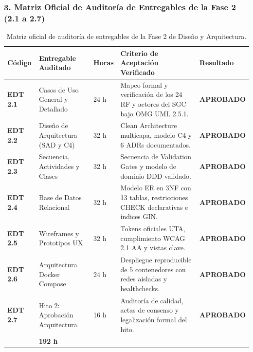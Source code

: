 \documentclass[12pt,a4paper]{article}
\begin{document}
\subsubsection*{3. Matriz Oficial de Auditoría de Entregables de la Fase 2 (2.1 a 2.7)}
\begin{table}[H]
\centering
\small
\renewcommand{\arraystretch}{1.2}
\begin{tabularx}{\textwidth}{|>{\hsize=0.55\hsize\centering\arraybackslash\bfseries\footnotesize}X|>{\hsize=1.15\hsize\raggedright\arraybackslash\footnotesize}X|>{\hsize=0.50\hsize\centering\arraybackslash\footnotesize}X|>{\hsize=2.10\hsize\raggedright\arraybackslash\footnotesize}X|>{\hsize=0.70\hsize\centering\arraybackslash\footnotesize}X|}
\hline
\rowcolor{tableheader}
\textbf{Código} & \textbf{Entregable Auditado} & \textbf{Horas} & \textbf{Criterio de Aceptación Verificado} & \textbf{Resultado} \\
\hline
\textbf{EDT 2.1} & Casos de Uso General y Detallado & 24 h & Mapeo formal y verificación de los 24 RF y actores del SGC bajo OMG UML 2.5.1. & \textbf{APROBADO} \\
\hline
\textbf{EDT 2.2} & Diseño de Arquitectura (SAD y C4) & 32 h & Clean Architecture multicapa, modelo C4 y 6 ADRs documentados. & \textbf{APROBADO} \\
\hline
\textbf{EDT 2.3} & Secuencia, Actividades y Clases & 32 h & Secuencia de Validation Gates y modelo de dominio DDD validado. & \textbf{APROBADO} \\
\hline
\textbf{EDT 2.4} & Base de Datos Relacional & 32 h & Modelo ER en 3NF con 13 tablas, restricciones CHECK declarativas e índices GIN. & \textbf{APROBADO} \\
\hline
\textbf{EDT 2.5} & Wireframes y Prototipos UX & 32 h & Tokens oficiales UTA, cumplimiento WCAG 2.1 AA y vistas clave. & \textbf{APROBADO} \\
\hline
\textbf{EDT 2.6} & Arquitectura Docker Compose & 24 h & Despliegue reproducible de 5 contenedores con redes aisladas y healthchecks. & \textbf{APROBADO} \\
\hline
\textbf{EDT 2.7} & Hito 2: Aprobación Arquitectura & 16 h & Auditoría de calidad, actas de consenso y legalización formal del hito. & \textbf{APROBADO} \\
\hline
\multicolumn{2}{|r|}{\textbf{TOTAL HORAS FASE 2:}} & \textbf{192 h} & \multicolumn{2}{l|}{\textbf{100\% de Objetivos Técnicos Alcanzados}} \\
\hline
\end{tabularx}
\caption{Matriz oficial de auditoría de entregables de la Fase 2 de Diseño y Arquitectura.}
\end{table}
\end{document}
